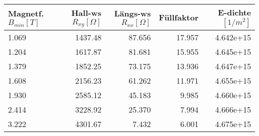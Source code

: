 \begin{tabular}{lrrrr}
\toprule
 Magnetf. $B_{min}[T]$ &    Hall-ws $R_{xy} [\Omega]$ 	&   Längs-ws $R_{xx}[\Omega]$ 	&  Füllfaktor &  E-dichte $[1/m^2]$\\
\midrule
  1.069 &   1437.48 &   87.656 	&       17.957 &         4.642e+15 \\
  1.204 &   1617.87 &   81.681 	&       15.955 &         4.645e+15 \\
  1.379 &   1852.25 &   73.175 	&       13.936 &         4.647e+15 \\
  1.608 &  2156.23 	&   61.262 	&       11.971 &         4.655e+15 \\
  1.930 & 2585.12 	&    45.183 &        9.985 &         4.660e+15 \\
  2.414 &   3228.92 &    25.370 &        7.994 &         4.666e+15 \\
  3.222 &   4301.67 &     7.432 &        6.001 &         4.675e+15 \\
\bottomrule
\end{tabular}
